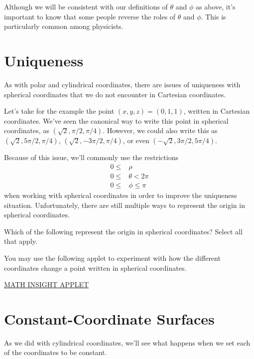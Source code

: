 \documentclass{ximera}
\begin{document}
Although we will be consistent with our definitions of $\theta$ and $\phi$ as above, it's important to know that some people reverse the roles of $\theta$ and $\phi$. This is particularly common among physicists.

\section*{Uniqueness}

As with polar and cylindrical coordinates, there are issues of uniqueness with spherical coordinates that we do not encounter in Cartesian coordinates.

Let's take for the example the point $(x,y,z) = (0,1,1)$, written in Cartesian coordinates. We've seen the canonical way to write this point in spherical coordinates, as $(\sqrt{2}, \pi/2, \pi/4)$. However, we could also write this as $(\sqrt{2}, 5\pi/2, \pi/4)$, $(\sqrt{2}, -3\pi/2, \pi/4)$, or even $(-\sqrt{2}, 3\pi/2, 5\pi/4)$.

Because of this issue, we'll commonly use the restrictions
\begin{align*}
0\leq &\rho\\
0\leq &\theta<2\pi\\
0\leq &\phi\leq\pi
\end{align*}
when working with spherical coordinates in order to improve the uniqueness situation. Unfortunately, there are still multiple ways to represent the origin in spherical coordinates.

\begin{problem}
Which of the following represent the origin in spherical coordinates? Select all that apply.
\begin{selectAll}
\end{selectAll}
\end{problem}

You may use the following applet to experiment with how the different coordinates change a point written in spherical coordinates.

\href{https://mathinsight.org/spherical_coordinates}{MATH INSIGHT APPLET}

\section*{Constant-Coordinate Surfaces}

As we did with cylindrical coordinates, we'll see what happens when we set each of the coordinates to be constant.
\end{document}
